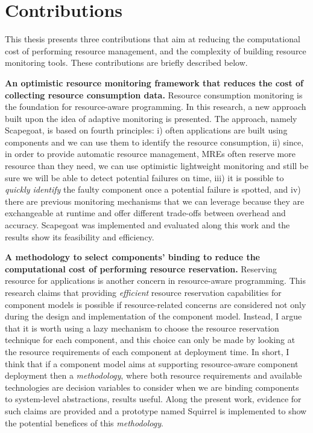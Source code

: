 \documentclass[11pt,a4paper]{paper}
\begin{document}
\section{Contributions}

This thesis presents three contributions that aim at reducing the computational cost of performing resource management, and the complexity of building resource monitoring tools.
These contributions are briefly described below.

\textbf{An optimistic resource monitoring framework that reduces the cost of collecting resource consumption data.}
Resource consumption monitoring is the foundation for resource-aware programming.
In this research, a new approach built upon the idea of adaptive monitoring is presented.
The approach, namely Scapegoat, is based on fourth principles: i) often applications are built using components and we can use them to identify the resource consumption, ii) since, in order to provide automatic resource management, MREs often reserve more resource than they need, we can use optimistic lightweight monitoring and still be sure we will be able to detect potential failures on time, iii) it is possible to \textit{quickly identify} the faulty component once a potential failure is spotted, and iv) there are previous monitoring mechanisms that we can leverage because they are exchangeable at runtime and offer different trade-offs between overhead and accuracy.
Scapegoat was implemented and evaluated along this work and the results show its feasibility and efficiency.

\textbf{A methodology to select components' binding to reduce the computational cost of performing resource reservation.}
Reserving resource for applications is another concern in resource-aware programming.
This research claims that providing \textit{efficient} resource reservation capabilities for component models is possible if resource-related concerns are considered not only during the design and implementation of the component model.
Instead, I argue that it is worth using a lazy mechanism to choose the resource reservation technique for each component, and this choice can only be made by looking at the resource requirements of each component at deployment time.
In short, I think that if a component model aims at supporting resource-aware component deployment then a \textit{methodology}, where both resource requirements and available technologies are decision variables to consider when we are binding components to system-level abstractions, results useful.
Along the present work, evidence for such claims are provided and a prototype named Squirrel is implemented to show the potential benefices of this \textit{methodology}.
\end{document}
